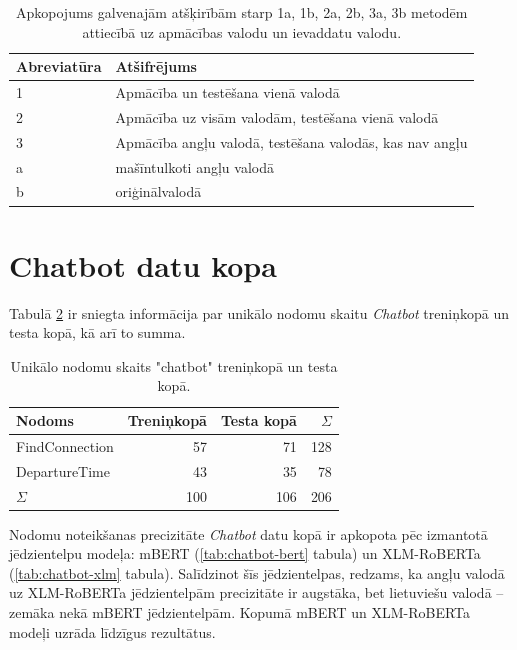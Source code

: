 \begin{table}[htbp]
  \centering
  \caption{Apkopojums galvenajām atšķirībām starp 1a, 1b, 2a, 2b, 3a, 3b metodēm attiecībā uz apmācības valodu un ievaddatu valodu.}
    \begin{tabular}{ll}\toprule
    Abreviatūra & Atšifrējums \\\midrule
    1 & Apmācība un testēšana vienā valodā \\
    2 & Apmācība uz visām valodām, testēšana vienā valodā \\
    3 & Apmācība angļu valodā, testēšana valodās, kas nav angļu \\\midrule
    a & mašīntulkoti angļu valodā \\
    b & oriģinālvalodā \\\bottomrule
    \end{tabular}%
  \label{tab:legend}%
\end{table}%



\section{Chatbot datu kopa}

Tabulā \ref{tab:chatbot-labels} ir sniegta informācija par unikālo nodomu skaitu  \textit{Chatbot} treniņkopā un testa kopā, kā arī to summa.

\begin{table}[htbp]
  \centering
  \caption{Unikālo nodomu skaits "chatbot" treniņkopā un testa kopā.}
    \begin{tabular}{lrrr} \toprule
    Nodoms & Treniņkopā & Testa kopā & $\Sigma$ \\\midrule
    FindConnection & 57    & 71 & 128 \\
    DepartureTime & 43    & 35 & 78 \\
    $\Sigma$ & 100    & 106 & 206 \\\bottomrule
    \end{tabular}%
  \label{tab:chatbot-labels}%
\end{table}%


Nodomu noteikšanas precizitāte \textit{Chatbot} datu kopā ir apkopota pēc izmantotā jēdzientelpu modeļa: mBERT (\ref{tab:chatbot-bert} tabula) un XLM-RoBERTa (\ref{tab:chatbot-xlm} tabula). Salīdzinot šīs jēdzientelpas, redzams, ka angļu valodā uz XLM-RoBERTa jēdzientelpām precizitāte ir augstāka, bet lietuviešu valodā -- zemāka nekā mBERT jēdzientelpām. Kopumā mBERT un XLM-RoBERTa modeļi uzrāda līdzīgus rezultātus.

